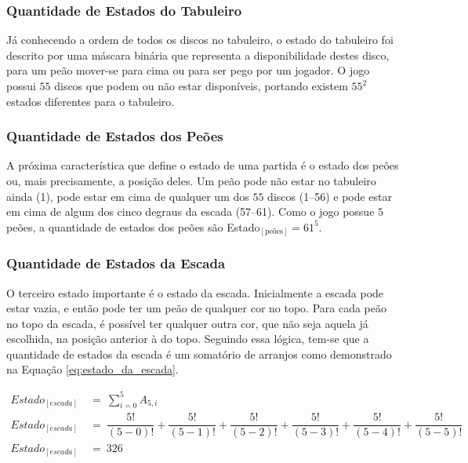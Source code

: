 \subsubsection{Quantidade de Estados do Tabuleiro}

Já conhecendo a ordem de todos os discos no tabuleiro, o estado do tabuleiro foi descrito por uma máscara binária que representa a disponibilidade destes disco, para um peão mover-se para cima ou para ser pego por um jogador. O jogo possui $55$ discos que podem ou não estar disponíveis, portando existem $55^2$ estados diferentes para o tabuleiro.

\subsubsection{Quantidade de Estados dos Peões}

A próxima característica que define o estado de uma partida é o estado dos peões ou, mais precisamente, a posição deles. Um peão pode não estar no tabuleiro ainda (1), pode estar em cima de qualquer um dos $55$ discos (1--56) e pode estar em cima de algum dos cinco degraus da escada (57--61). Como o jogo possue $5$ peões, a quantidade de estados dos peões são Estado$_{[\text{peões}]}=61^5$.

\subsubsection{Quantidade de Estados da Escada}

O terceiro estado importante é o estado da escada. Inicialmente a escada pode estar vazia, e então pode ter um peão de qualquer cor no topo. Para cada peão no topo da escada, é possível ter qualquer outra cor, que não seja aquela já escolhida, na posição anterior à do topo. Seguindo essa lógica, tem-se que a quantidade de estados da escada é um somatório de arranjos como demonstrado na Equação \ref{eq:estado_da_escada}.

\begin{equation} \label{eq:estado_da_escada} \tag{e.q. Estado da escada}
\begin{split}
	Estado_{[escada]}\ &=\ \displaystyle\sum_{i=0}^{5} A_{5,i}\\
	Estado_{[escada]}\ &=\ \dfrac{5!}{(5-0)!} + \dfrac{5!}{(5-1)!} + \dfrac{5!}{(5-2)!} + \dfrac{5!}{(5-3)!} + \dfrac{5!}{(5-4)!} + \dfrac{5!}{(5-5)!}\\
	Estado_{[escada]}\ &=\ 326
\end{split}
\end{equation}

